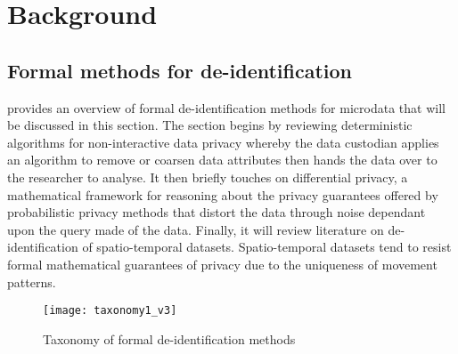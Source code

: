 



\section{Background}
\label{ch:ethics-background}

\subsection{Formal methods for de-identification}


 provides an overview of formal de-identification methods for microdata that will be discussed in this section. The section begins by reviewing deterministic algorithms for non-interactive data privacy whereby the data custodian applies an algorithm to remove or coarsen data attributes then hands the data over to the researcher to analyse. It then briefly touches on differential privacy, a mathematical framework for reasoning about the privacy guarantees offered by probabilistic privacy methods that distort the data through noise dependant upon the query made of the data. Finally, it will review literature on de-identification of spatio-temporal datasets. Spatio-temporal datasets tend to resist formal mathematical guarantees of privacy due to the uniqueness of movement patterns.

\begin{figure}[h]
  \centering
  \texttt{[image: taxonomy1\_v3]}
  \caption{Taxonomy of formal de-identification methods}
  \label{fig:deident-taxonomy}
\end{figure}

